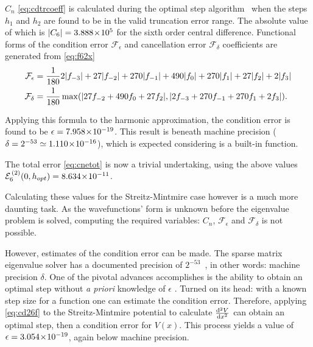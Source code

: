 $C_n$ \cref{eq:cdtrcoeff} is calculated during the optimal step algorithm~\cite{Mathur2012} when the steps $h_1$ and $h_2$ are found to be in the valid truncation error range.
The absolute value of which is $\lvert C_6\rvert = 3.888\!\times\!10^{5}$ for the sixth order central difference.
Functional forms of the condition error $\mathcal{F}_\epsilon$ and cancellation error $\mathcal{F}_\delta$ coefficients are generated from \cref{eq:f62x}
{\mathindent=0.4cm
\begin{align}
\mathcal{F}_\epsilon &= \frac{1}{180}2\lvert f_{-3}\rvert + 27\lvert f_{-2}\rvert + 270\lvert f_{-1}\rvert + 490\lvert f_{0}\rvert + 270\lvert f_{1}\rvert + 27\lvert f_{2}\rvert + 2\lvert f_{3}\rvert \\
\mathcal{F}_\delta &= \frac{1}{180}\max(\lvert27f_{-2} + 490f_{0} + 27f_{2}\rvert,\lvert2f_{-3} + 270f_{-1} + 270f_{1} + 2f_{3}\rvert).
\end{align}
}

Applying this formula to the harmonic approximation, the condition error is found to be $\epsilon = 7.958\!\times\!10^{-19}$.
This result is beneath machine precision ($\delta = 2^{-53} \simeq 1.110\!\times\!10^{-16}$), which is expected considering  is a built-in function.

The total error \cref{eq:cnetot} is now a trivial undertaking, using the above values $\mathcal{E}_6^{\,(2)}(0,h_{opt}) = 8.634\!\times\!10^{-11}$.

Calculating these values for the Streitz-Mintmire case however is a much more daunting task.
As the wavefunctions' form is unknown before the eigenvalue problem is solved, computing the required variables: $C_n$, $\mathcal{F}_\epsilon$ and $\mathcal{F}_\delta$ is not possible.

However, estimates of the condition error can be made.
The sparse matrix eigenvalue solver  has a documented precision of $2^{-53}$~\cite{Mathworks2014}, in other words: machine precision $\delta$.
One of the pivotal advances \citeauthor{Mathur2012} accomplishes is the ability to obtain an optimal step without \textit{a priori} knowledge of $\epsilon$ \cite{Mathur2012}.
Turned on its head: with a known step size for a function one can estimate the condition error.
Therefore, applying \cref{eq:cd26f} to the Streitz-Mintmire potential to calculate $\cramped{\frac{\mathrm{d}^2V}{\mathrm{d}x^2}}$ can obtain an optimal step, then a condition error for $V(x)$.
This process yields a value of $\epsilon = 3.054\!\times\!10^{-19}$, again below machine precision.


